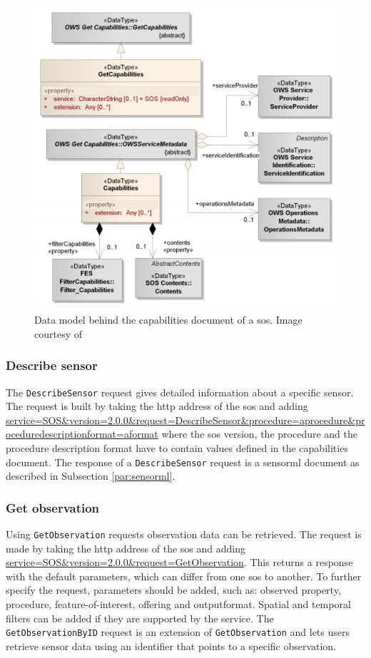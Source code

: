 \begin{figure}
	\centering
	\includegraphics[width=0.7\linewidth]{figs/SOS_2_dataModel_GetCapabilities.PNG}
	\caption{Data model behind the capabilities document of a \ac{sos}. Image courtesy of \cite{SW:OGC2}}
	\label{fig:Capabilities}
\end{figure}

\subsubsection{Describe sensor}

\begin{sloppypar}
	The \texttt{DescribeSensor} request gives detailed information about a specific sensor. The request is built by taking the \ac{http} address of the \ac{sos} and adding \url{service=SOS\&version=2.0.0\&request=DescribeSensor\&procedure=aprocedure\&proceduredescriptionformat=aformat} where the \ac{sos} version, the procedure and the procedure description format have to contain values defined in the capabilities document. The response of a \texttt{DescribeSensor} request is a \ac{sensorml} document as described in Subsection \ref{par:sensorml}.
\end{sloppypar}


\subsubsection{Get observation}
\label{par:getObservation}

Using \texttt{GetObservation} requests observation data can be retrieved. The request is made by taking the \ac{http} address of the \ac{sos} and adding \url{service=SOS\&version=2.0.0\&request=GetObservation}. This returns a response with the default parameters, which can differ from one \ac{sos} to another. To further specify the request, parameters should be added, such as: observed property, procedure, feature-of-interest, offering and outputformat. Spatial and temporal filters can be added if they are supported by the service. The \texttt{GetObservationByID} request is an extension of \texttt{GetObservation} and lets users retrieve sensor data using an identifier that points to a specific observation.

